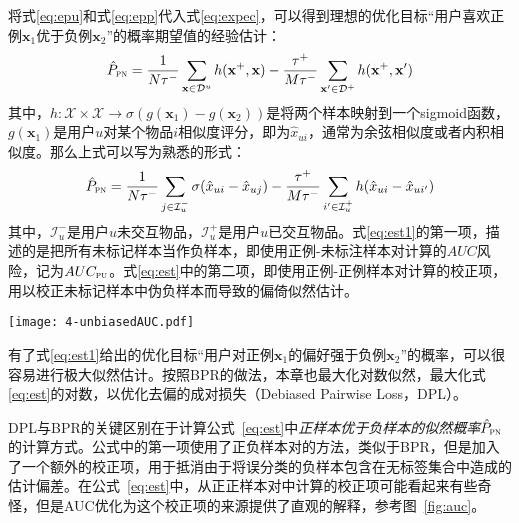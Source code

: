 将式\eqref{eq:epu}和式\eqref{eq:epp}代入式\eqref{eq:expec}，可以得到理想的优化目标“用户喜欢正例$\mathbf{x}_1$优于负例$\mathbf{x}_2$”的概率期望值的经验估计：
\begin{eqnarray}\label{eq:est}
	\hat{P}_\textsc{pn} = \frac{1}{N\tau^-}
	\sum_{\mathbf{x} \in \mathcal{D}^u}h(\mathbf{x}^+,\mathbf{x})  - \frac{\tau^+}{M\tau^-}\sum_{\mathbf{x}^\prime\in \mathcal{D}^+}h(\mathbf{x}^+, \mathbf{x}^\prime)
\end{eqnarray}
其中，$h: \mathcal{X}\times\mathcal{X} \rightarrow \sigma(g(\mathbf{x}_1) - g(\mathbf{x}_2))$是将两个样本映射到一个sigmoid函数，$g(\mathbf{x}_1)$是用户$u$对某个物品$i$相似度评分，即为$\hat{x}_{ui}$，通常为余弦相似度或者内积相似度。那么上式可以写为熟悉的形式：
\begin{eqnarray}\label{eq:est1}
	\hat{P}_\textsc{pn} = \frac{1}{N\tau^-}
	\sum_{j \in \mathcal{I}_u^-}\sigma(\hat{x}_{ui}-\hat{x}_{uj})  - \frac{\tau^+}{M\tau^-}\sum_{i^\prime \in \mathcal{I}_u^+}h(\hat{x}_{ui} - \hat{x}_{ui^\prime})
\end{eqnarray}
其中，$\mathcal{I}_u^-$是用户$u$未交互物品，$\mathcal{I}_u^+$是用户$u$已交互物品。式\eqref{eq:est1}的第一项，描述的是把所有未标记样本当作负样本，即使用正例-未标注样本对计算的$AUC$风险，记为$AUC_\textsc{pu}$。式\eqref{eq:est}中的第二项，即使用正例-正例样本对计算的校正项，用以校正未标记样本中伪负样本而导致的偏倚似然估计。

\begin{figure*}[h!]
	\centering
	\texttt{[image: 4-unbiasedAUC.pdf]}
	\caption{去偏成对损失的示意图} 
	\label{fig:auc}
\end{figure*}

有了式\eqref{eq:est1}给出的优化目标“用户对正例$\mathbf{x}_1$的偏好强于负例$\mathbf{x}_2$”的概率，可以很容易进行极大似然估计。按照BPR的做法，本章也最大化对数似然，最大化式\eqref{eq:est}的对数，以优化去偏的成对损失（Debiased Pairwise Loss，DPL）。

DPL与BPR的关键区别在于计算公式~\eqref{eq:est}中\textit{正样本优于负样本的似然概率$\hat{P}_\textsc{pn}$}的计算方式。公式中的第一项使用了正负样本对的方法，类似于BPR，但是加入了一个额外的校正项，用于抵消由于将误分类的负样本包含在无标签集合中造成的估计偏差。在公式~\eqref{eq:est}中，从正正样本对中计算的校正项可能看起来有些奇怪，但是AUC优化为这个校正项的来源提供了直观的解释，参考图~\ref{fig:auc}。

